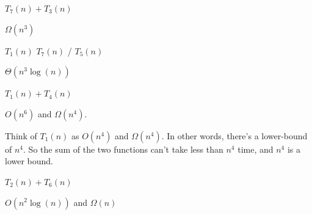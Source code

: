 \begin{prob}
\begin{subprobset}
        \begin{subprob}
            $T_7(n) + T_3(n)$

            \begin{soln}
                $\Omega(n^3)$
            \end{soln}
        \end{subprob}

        \begin{subprob}
            $T_1(n)$ \text{\cdot } $T_7(n)$  /  $T_5(n)$

            \begin{soln}
                $\Theta(n^3 \log(n))$
            \end{soln}
        \end{subprob}

        \begin{subprob}
            $T_1(n) + T_4(n)$

            \begin{soln}
                $O(n^6)$ and $\Omega(n^4)$.

                Think of $T_1(n)$ as $O(n^4)$ and $\Omega(n^4)$. In other words,
                there's a lower-bound of $n^4$. So the sum of the two functions can't
                take less than $n^4$ time, and $n^4$ is a lower bound.
            \end{soln}
        \end{subprob}

        \begin{subprob}
            $T_2(n) + T_6(n)$

            \begin{soln}
                $O(n^2 \log(n))$ and $\Omega(n)$

            \end{soln}

        \end{subprob}

    \end{subprobset}

\end{prob}

